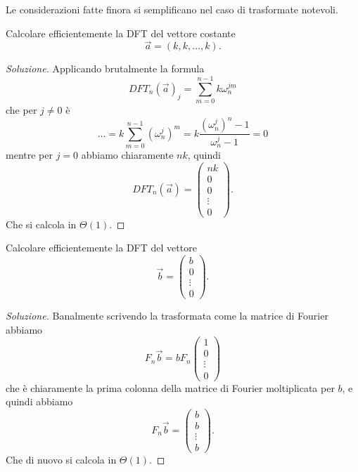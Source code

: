 \documentclass[11pt]{scrartcl}
\newcommand{\bigtheta}[1]{\Theta\!\left(#1\right)}
\begin{document}
	Le considerazioni fatte finora si semplificano nel caso di trasformate notevoli.
	\begin{example}
		Calcolare efficientemente la DFT del vettore costante $$\vec{a}=\left(k,k,\dots,k\right).$$
	\end{example}
	\begin{proof}[Soluzione]
		Applicando brutalmente la formula
		$$DFT_n(\vec{a})_j=\sum_{m=0}^{n-1}k\omega_n^{jm}$$
		che per $j\ne 0$ è 
		$$\dots=k\sum_{m=0}^{n-1}\left(\omega_n^j\right)^m=k\frac{\left(\omega_n^j\right)^n-1}{\omega_n^j-1}=0$$
		mentre per $j=0$ abbiamo chiaramente $nk$, quindi
		$$DFT_n(\vec{a})=\begin{pmatrix}
			nk \\
			0 \\
			0 \\
			\vdots \\
			0
		\end{pmatrix}.$$
		Che si calcola in $\bigtheta{1}$.
	\end{proof}
	\begin{example}
		Calcolare efficientemente la DFT del vettore
		$$\vec{b}=\begin{pmatrix}
			b \\
			0 \\
			\vdots \\
			0
		\end{pmatrix}.$$
	\end{example}
	\begin{proof}[Soluzione]
		Banalmente scrivendo la trasformata come la matrice di Fourier abbiamo
		$$F_n\vec{b}=bF_n\begin{pmatrix}
			1 \\
			0 \\
			\vdots \\
			0
		\end{pmatrix}$$
		che è chiaramente la prima colonna della matrice di Fourier moltiplicata per $b$, e quindi abbiamo
		$$F_n\vec{b}=\begin{pmatrix}
			b \\ 
			b \\
			\vdots \\
			b
		\end{pmatrix}.$$
		Che di nuovo si calcola in $\bigtheta{1}$.
	\end{proof}
	
\end{document}
